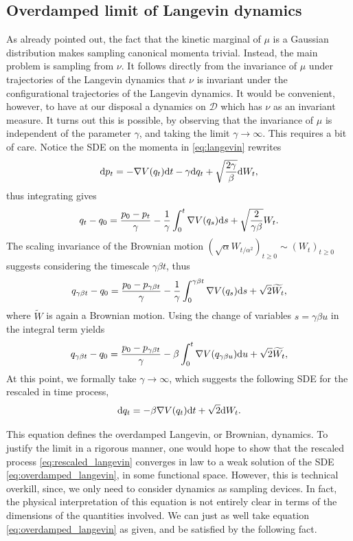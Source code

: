     \subsection{Overdamped limit of Langevin dynamics}
        As already pointed out, the fact that the kinetic marginal of $\mu$ is a Gaussian distribution makes sampling canonical momenta trivial. 
        Instead, the main problem is sampling from $\nu$. It follows directly from the invariance of $\mu$ under trajectories of the Langevin dynamics that $\nu$ is invariant under the configurational trajectories of the Langevin dynamics.
        It would be convenient, however, to have at our disposal a dynamics on $\mathcal D$ which has $\nu$ as an invariant measure.
        It turns out this is possible, by observing that the invariance of $\mu$ is independent of the parameter $\gamma$, and taking the limit $\gamma\to\infty$. This requires a bit of care.
        Notice the SDE on the momenta in \eqref{eq:langevin} rewrites 
        \[\mathrm{d} p_t=-\nabla V(q_t)\mathrm{d} t-\gamma \mathrm{d} q_t+\sqrt{\frac{2\gamma}\beta}\mathrm{d} W_t,\]
        thus integrating gives
        \[q_t-q_0=\frac{p_0-p_t}\gamma -\frac{1}\gamma\int_0^t\nabla V(q_s)\mathrm{d} s +\sqrt{\frac{2}{\gamma\beta}}W_t.\]
        The scaling invariance of the Brownian motion $(\sqrt{\alpha}W_{t/\alpha^2})_{t\geq 0}\sim (W_t)_{t\geq 0}$ suggests considering the timescale $\gamma\beta t$, thus
        \[q_{\gamma\beta t}-q_0=\frac{p_0-p_{\gamma\beta t}}\gamma-\frac1{\gamma}\int_0^{\gamma\beta t}\nabla V(q_s)\mathrm{d} s +\sqrt{2}\widetilde{W_t},\]
        where $\widetilde W$ is again a Brownian motion. Using the change of variables $s=\gamma \beta u$ in the integral term yields
        \begin{equation}\label{eq:rescaled_langevin}q_{\gamma\beta t}-q_0=\frac{p_0-p_{\gamma\beta t}}\gamma-\beta\int_0^{t}\nabla V(q_{\gamma\beta u})\mathrm{d} u +\sqrt{2}\widetilde{W_t},\end{equation}
        At this point, we formally take $\gamma\to\infty$, which suggests the following SDE for the rescaled in time process,
        \begin{equation}
            \label{eq:overdamped_langevin}
            \mathrm{d} q_t=-\beta \nabla V(q_t)\mathrm{d} t+\sqrt{2}\mathrm{d} W_t.
        \end{equation}
        
        This equation defines the overdamped Langevin, or Brownian, dynamics.
        To justify the limit in a rigorous manner, one would hope to show that the rescaled process \eqref{eq:rescaled_langevin} converges in law to a weak solution of the SDE \eqref{eq:overdamped_langevin}, in some functional space.
        However, this is technical overkill, since, we only need to consider dynamics as sampling devices. In fact, the physical interpretation of this equation is not entirely clear in terms of the dimensions of the quantities involved.
        We can just as well take equation \eqref{eq:overdamped_langevin} as given, and be satisfied by the following fact.
    
